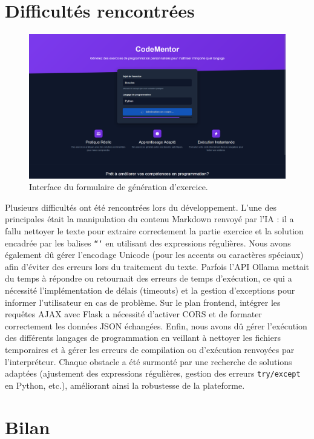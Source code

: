\documentclass[a4paper, 12pt, twoside]{article}
\begin{document}
\section{Difficultés rencontrées}
\begin{figure}[h!]
\centering
\includegraphics[width=1.2\textwidth]{formulaire.png}
\caption{Interface du formulaire de génération d'exercice.}
\label{fig:formulaire}
\end{figure}

Plusieurs difficultés ont été rencontrées lors du développement. L'une des principales était la manipulation du contenu Markdown renvoyé par l'IA : il a fallu nettoyer le texte pour extraire correctement la partie exercice et la solution encadrée par les balises \texttt{```} en utilisant des expressions régulières. Nous avons également dû gérer l'encodage Unicode (pour les accents ou caractères spéciaux) afin d'éviter des erreurs lors du traitement du texte. Parfois l'API Ollama mettait du temps à répondre ou retournait des erreurs de temps d'exécution, ce qui a nécessité l'implémentation de délais (timeouts) et la gestion d'exceptions pour informer l'utilisateur en cas de problème. Sur le plan frontend, intégrer les requêtes AJAX avec Flask a nécessité d'activer CORS et de formater correctement les données JSON échangées. Enfin, nous avons dû gérer l'exécution des différents langages de programmation en veillant à nettoyer les fichiers temporaires et à gérer les erreurs de compilation ou d'exécution renvoyées par l'interpréteur. Chaque obstacle a été surmonté par une recherche de solutions adaptées (ajustement des expressions régulières, gestion des erreurs \texttt{try/except} en Python, etc.), améliorant ainsi la robustesse de la plateforme.

\section{Bilan}
\end{document}
